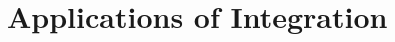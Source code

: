\documentclass[../abcalc.tex]{subfiles}
\begin{document}
\chapter{Applications of Integration}
\end{document}
